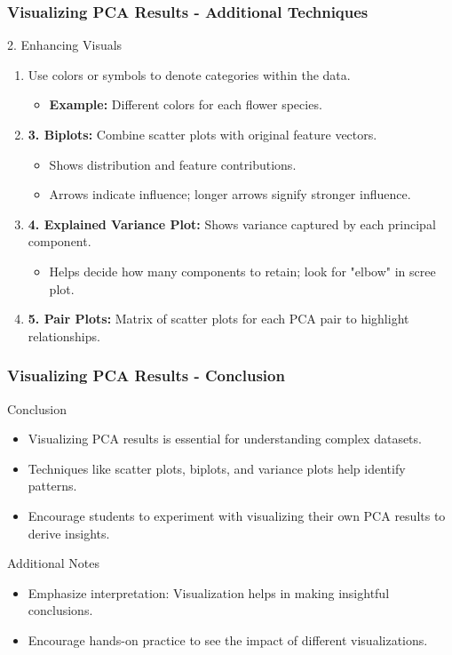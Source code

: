 \documentclass[aspectratio=169]{beamer}
\begin{document}
\begin{frame}[fragile]
    \frametitle{Visualizing PCA Results - Additional Techniques}
    \begin{block}{2. Enhancing Visuals}
        \begin{enumerate}
            \item Use colors or symbols to denote categories within the data.
                \begin{itemize}
                    \item \textbf{Example:} Different colors for each flower species.
                \end{itemize}
            \item \textbf{3. Biplots:} Combine scatter plots with original feature vectors.
                \begin{itemize}
                    \item Shows distribution and feature contributions.
                    \item Arrows indicate influence; longer arrows signify stronger influence.
                \end{itemize}
            \item \textbf{4. Explained Variance Plot:} Shows variance captured by each principal component.
                \begin{itemize}
                    \item Helps decide how many components to retain; look for "elbow" in scree plot.
                \end{itemize}
            \item \textbf{5. Pair Plots:} Matrix of scatter plots for each PCA pair to highlight relationships.
        \end{enumerate}
    \end{block}
\end{frame}

\begin{frame}[fragile]
    \frametitle{Visualizing PCA Results - Conclusion}
    \begin{block}{Conclusion}
        \begin{itemize}
            \item Visualizing PCA results is essential for understanding complex datasets.
            \item Techniques like scatter plots, biplots, and variance plots help identify patterns.
            \item Encourage students to experiment with visualizing their own PCA results to derive insights.
        \end{itemize}
    \end{block}
    \begin{block}{Additional Notes}
        \begin{itemize}
            \item Emphasize interpretation: Visualization helps in making insightful conclusions.
            \item Encourage hands-on practice to see the impact of different visualizations.
        \end{itemize}
    \end{block}
\end{frame}
\end{document}
